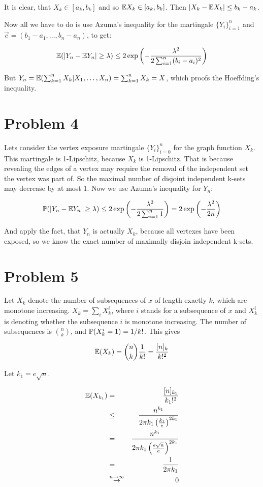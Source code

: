 \documentclass[a4paper]{article}
\begin{document}
It is clear, that $ X_{k} \in [a_k, b_k] $ and so $ \E X_k \in [a_k, b_k] $.
Then $ |X_k - \E X_k| \le b_k - a_k $.

Now all we have to do is use Azuma's inequality for the martingale $ \{ Y_i
\}_{i=1}^n $ and $ \vec c = (b_1 - a_1, \dots, b_n - a_n) $, to get:

\[
  \E(|Y_n - \E Y_n| \ge \lambda) \le 2 \exp\B{ - \frac{\lambda^2}{2\sum_{i=1}^n (b_i - a_i)^2}} 
\]

But $ Y_n = \E(\sum_{k=1}^n X_k | X_1, \dots, X_n) = \sum_{k=1}^n X_k = X $,
which proofs the Hoeffding's inequality.

\section*{Problem 4}

Lets consider the vertex exposure martingale $ \{ Y_i \}_{i=0}^n $ for the
graph function $ X_k $. This martingale is 1-Lipschitz, because $ X_k $ is
1-Lipschitz. That is because revealing the edges of a vertex may require the
removal of the independent set the vertex was part of. So the maximal number of
disjoint independent k-sets may decrease by at most 1. Now we use Azuma's
inequality for $ Y_n $:

\[
  \P(|Y_n - \E Y_n| \ge \lambda) \le 2\exp\B{-\frac{\lambda^2}{2\sum_{i=1}^n 1}}
                      = 2\exp\B{-\frac{\lambda^2}{2n}}
\]

And apply the fact, that $ Y_n $ is actually $ X_k $, because all vertexes have
been exposed, so we know the exact number of maximally disjoin independent
k-sets.

\section*{Problem 5}

Let $ X_k $ denote the number of subsequences of $ x $ of length exactly $ k $,
which are monotone increasing. $ X_k = \sum_{i} X_k^i $, where $ i $ stands for
a subsequence of $ x $ and $ X_k^i $ is \irv denoting whether the subsequence
$ i $ is monotone increasing. The number of subsequences is $ \binom{n}{k} $,
and $ \P(X_k^i = 1) = 1 / k! $. This gives

\[ \E(X_k) = \binom{n}{k}\frac{1}{k!} = \frac{[n]_k}{k!^2} \]

Let $ k_1 = e\sqrt{n} $.

\begin{eqnarray*}
\E(X_{k_1})
  &=& \frac{[n]_{k_1}}{k_1!^2} \\
  &\le& \frac{n^{k_1}}{2\pi k_1\bfrac{k_1}{e}^{2k_1}} \\
  &=& \frac{n^{k_1}}{2\pi k_1\bfrac{e\sqrt{n}}{e}^{2k_1}} \\
  &=& \frac{1}{2\pi k_1} \\
  &\overset{n \to \infty}\to& 0 \\
\end{eqnarray*}
\end{document}
